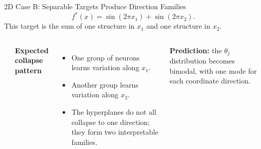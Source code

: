 \documentclass[aspectratio=169,10pt]{beamer}
\begin{document}
\begin{frame}{2D Case B: Separable Targets Produce Direction Families}
\small
\[
f^\ast(x)=\sin(2\pi x_1)+\sin(2\pi x_2).
\]
\vspace{-0.25cm}
This target is the sum of one structure in $x_1$ and one structure in $x_2$.

\begin{columns}[T,onlytextwidth]
\begin{center}
\end{center}

\textbf{\textcolor{rtgnavy}{Expected collapse pattern}}
\begin{itemize}
  \item One group of neurons learns variation along $x_1$.
  \item Another group learns variation along $x_2$.
  \item The hyperplanes do not all collapse to one direction; they form two interpretable families.
\end{itemize}

\vspace{0.08cm}
\begin{tcolorbox}[slideboxB]
\centering\textbf{Prediction:} the $\theta_j$ distribution becomes bimodal, with one mode for each coordinate direction.
\end{tcolorbox}
\end{columns}
\end{frame}
\end{document}

